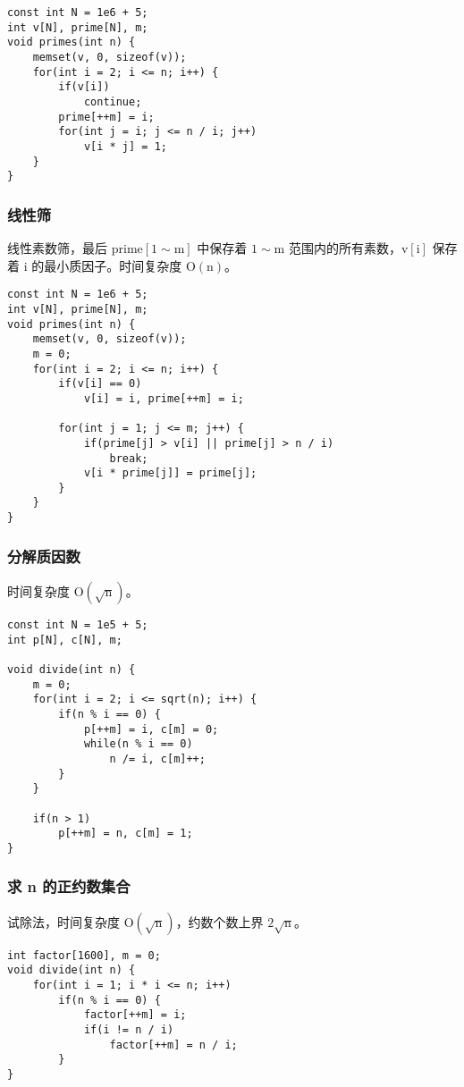 \documentclass[UTF8]{article}
\begin{document}
\begin{lstlisting}[caption=埃氏筛]
const int N = 1e6 + 5;
int v[N], prime[N], m;
void primes(int n) {
	memset(v, 0, sizeof(v));
	for(int i = 2; i <= n; i++) {
		if(v[i])
			continue;
		prime[++m] = i;
		for(int j = i; j <= n / i; j++)
			v[i * j] = 1;
	}
}
\end{lstlisting}

\subsubsection{线性筛}
线性素数筛，最后 $\mathrm{prime[1 \sim m]}$ 中保存着 $\mathrm{1 \sim m}$ 范围内的所有素数，$\mathrm{v[i]}$ 保存着 $\mathrm{i}$ 的最小质因子。时间复杂度 $\mathrm{O(n)}$。
\begin{lstlisting}[caption=线性筛]
const int N = 1e6 + 5;
int v[N], prime[N], m;
void primes(int n) {
    memset(v, 0, sizeof(v));
    m = 0;
    for(int i = 2; i <= n; i++) {
        if(v[i] == 0)
            v[i] = i, prime[++m] = i;
        
        for(int j = 1; j <= m; j++) {
            if(prime[j] > v[i] || prime[j] > n / i)
                break;
            v[i * prime[j]] = prime[j];
        }
    }
}
\end{lstlisting}

\subsubsection{分解质因数}
时间复杂度 $\mathrm{O(\sqrt{n})}$。
\begin{lstlisting}[caption=分解质因数]
const int N = 1e5 + 5;
int p[N], c[N], m;

void divide(int n) {
    m = 0;
    for(int i = 2; i <= sqrt(n); i++) {
        if(n % i == 0) {
            p[++m] = i, c[m] = 0;
            while(n % i == 0)
                n /= i, c[m]++;
        }
    }

    if(n > 1)
        p[++m] = n, c[m] = 1;
}
\end{lstlisting}

\subsubsection{求 n 的正约数集合}
试除法，时间复杂度 $\mathrm{O(\sqrt{n})}$，约数个数上界 $\mathrm{2\sqrt{n}}$。
\begin{lstlisting}[caption=试除法求 n 的正约数集合]
int factor[1600], m = 0;
void divide(int n) {
    for(int i = 1; i * i <= n; i++) 
        if(n % i == 0) {
            factor[++m] = i;
            if(i != n / i)
                factor[++m] = n / i;
        }
}
\end{lstlisting}
\end{document}
